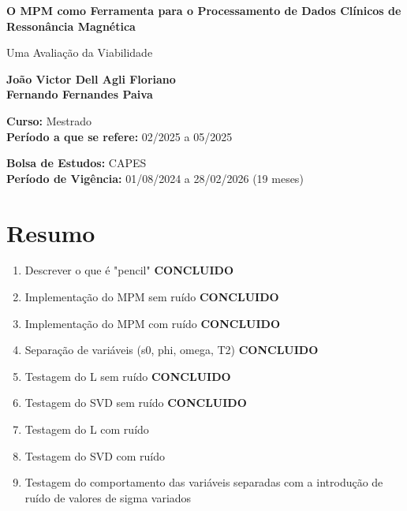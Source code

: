 \documentclass[12pt]{article}
\begin{document}
\begin{titlepage}
    \begin{center}
        \vspace*{1cm}
            
        \Huge
        \textbf{O MPM como Ferramenta para o Processamento de Dados Clínicos de Ressonância Magnética}
            
        \vspace{0.5cm}
        \LARGE
        Uma Avaliação da Viabilidade
            
        \vspace{1.5cm}
            
        \textbf{João Victor Dell Agli Floriano \\ Fernando Fernandes Paiva}

            
        \vfill
            
        \textbf{Curso:} Mestrado \\
        \textbf{Período a que se refere:} 02/2025 a 05/2025
            
        \vspace{0.8cm}
            
        \Large
        \textbf{Bolsa de Estudos:} CAPES \\
        \textbf{Período de Vigência:} 01/08/2024 a 28/02/2026 (19 meses)
            
    \end{center}
\end{titlepage}


\section{Resumo}

\begin{enumerate}
    \item Descrever o que é "pencil" \textbf{CONCLUIDO}
    \item Implementação do MPM sem ruído \textbf{CONCLUIDO}
    \item Implementação do MPM com ruído \textbf{CONCLUIDO}
    \item Separação de variáveis (s0, phi, omega, T2) \textbf{CONCLUIDO}
    \item Testagem do L sem ruído \textbf{CONCLUIDO}
    \item Testagem do SVD sem ruído \textbf{CONCLUIDO}
    \item Testagem do L com ruído 
    \item Testagem do SVD com ruído
    \item Testagem do comportamento das variáveis separadas com a introdução de ruído de valores de sigma variados
\end{enumerate}
\end{document}
